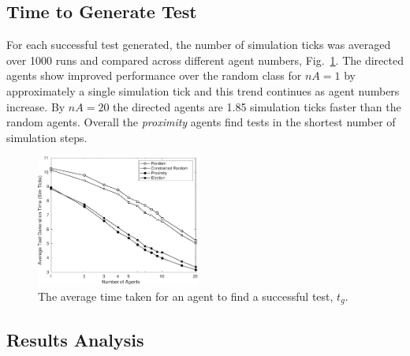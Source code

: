 \documentclass[letterpaper, 10 pt, journal, twoside]{IEEEtran}
\begin{document}
\subsection{Time to Generate Test}
For each successful test generated, the number of simulation ticks was averaged over 1000 runs and compared across different agent numbers, Fig.~\ref{Time}. 
%
The directed agents show improved performance over the random class for $nA=1$ by approximately a single simulation tick and this trend continues as agent numbers increase. By $nA=20$ the directed agents are 1.85 simulation ticks faster than the random agents. Overall the \textit{proximity} agents find tests in the shortest number of simulation steps.

\begin{figure}[!t]
	\centering
\includegraphics[width=0.48\textwidth]{TimeSimTicks.pdf}
	\caption{The average time taken for an agent to find a successful test, $t_{g}$.}
	\label{Time}
\end{figure}




\subsection{Results Analysis}
\end{document}
